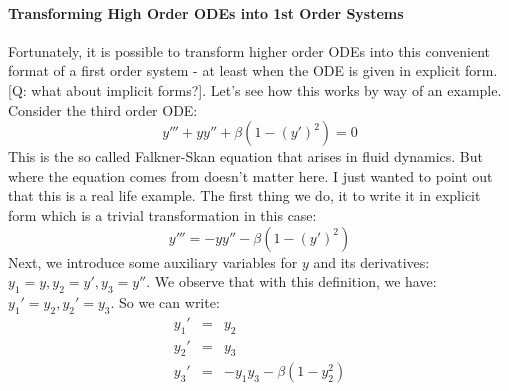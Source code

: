 \paragraph{Transforming High Order ODEs into 1st Order Systems}
Fortunately, it is possible to transform higher order ODEs into this convenient format of a first order system - at least when the ODE is given in explicit form. [Q: what about implicit forms?]. Let's see how this works by way of an example. Consider the third order ODE:
\begin{equation}
 y''' + y y'' + \beta (1 - (y')^2 ) = 0
\end{equation}
This is the so called Falkner-Skan equation that arises in fluid dynamics. But where the equation comes from doesn't matter here. I just wanted to point out that this is a real life example. The first thing we do, it to write it in explicit form which is a trivial transformation in this case:
\begin{equation}
 y''' =  - y y'' - \beta (1 - (y')^2 ) 
\end{equation}
Next, we introduce some auxiliary variables for $y$ and its derivatives: $y_1 = y, y_2 = y', y_3 = y''$. We observe that with this definition, we have: $y_1' = y_2, y_2' = y_3$. So we can write:
\begin{eqnarray}
 y_1' &=& y_2 \\
 y_2' &=& y_3 \\
 y_3' &=& -y_1 y_3 - \beta (1 - y_2^2)
\end{eqnarray}





%

